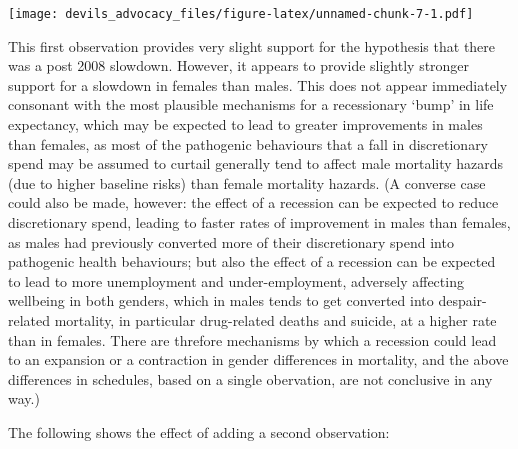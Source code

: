 \documentclass[]{article}
\begin{document}
\texttt{[image: devils\_advocacy\_files/figure-latex/unnamed-chunk-7-1.pdf]}

This first observation provides very slight support for the hypothesis
that there was a post 2008 slowdown. However, it appears to provide
slightly stronger support for a slowdown in females than males. This
does not appear immediately consonant with the most plausible mechanisms
for a recessionary `bump' in life expectancy, which may be expected to
lead to greater improvements in males than females, as most of the
pathogenic behaviours that a fall in discretionary spend may be assumed
to curtail generally tend to affect male mortality hazards (due to
higher baseline risks) than female mortality hazards. (A converse case
could also be made, however: the effect of a recession can be expected
to reduce discretionary spend, leading to faster rates of improvement in
males than females, as males had previously converted more of their
discretionary spend into pathogenic health behaviours; but also the
effect of a recession can be expected to lead to more unemployment and
under-employment, adversely affecting wellbeing in both genders, which
in males tends to get converted into despair-related mortality, in
particular drug-related deaths and suicide, at a higher rate than in
females. There are threfore mechanisms by which a recession could lead
to an expansion or a contraction in gender differences in mortality, and
the above differences in schedules, based on a single obervation, are
not conclusive in any way.)

The following shows the effect of adding a second observation:
\end{document}
